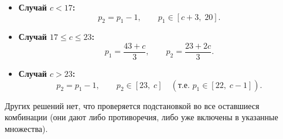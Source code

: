 \documentclass[12pt,a4paper]{extarticle}
\begin{document}
{  \begin{itemize}
    \item \textbf{Случай $c<17$:}
    \[
    \boxed{
      p_2 = p_1 - 1,\qquad p_1 \in [c+3,\; 20].
    }
    \]
    \item \textbf{Случай $17\le c\le 23$:}
    \[
    \boxed{
      p_1=\frac{43+c}{3},\qquad p_2=\frac{23+2c}{3}.
    }
    \]
    \item \textbf{Случай $c>23$:}
    \[
    \boxed{
      p_2 = p_1 - 1,\qquad p_2 \in [23,\; c] \quad(\text{т.е. } p_1\in[22,\; c-1]).
    }
    \]
  \end{itemize}
  Других решений нет, что проверяется подстановкой во все оставшиеся комбинации (они дают либо противоречия, либо уже включены в указанные множества).
}


\end{document}
